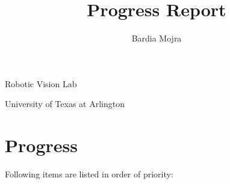 \documentclass[11pt]{article}
\title{Progress Report}
\author{Bardia Mojra}
\begin{document}
\maketitle
\thispagestyle{empty}

\begin{center}
	\bigskip
	\bigskip
	Robotic Vision Lab

	University of Texas at Arlington
\end{center}

\newpage

\section{Progress}
Following items are listed in order of priority:
\begin{itemize}


\end{itemize}
\end{document}
